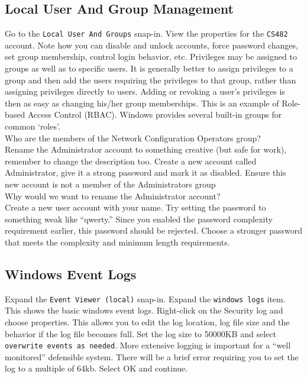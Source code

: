 \documentclass{article}
\begin{document}
\subsection{Local User And Group Management}

Go to the {\tt Local User And Groups} snap-in. View the properties for the {\tt CS482} account.  Note how you can disable and unlock accounts, force password changes, set group membership, control login behavior, etc. 
Privileges may be assigned to groups as well as to specific users. It is generally better to assign privileges to a group and then add the users requiring the privileges to that group, rather than assigning privileges directly to users. Adding or revoking a user's privileges is then as easy as changing his/her group memberships. This is an example of Role-based Access Control (RBAC). Windows provides several built-in groups for common `roles'. \\

\question Who are the members of the Network Configuration Operators group? \\

Rename the Administrator account to something creative (but safe for work), remember to change the description too. Create a new account called Administrator, give it a strong password and mark it as disabled. Ensure this new account is not a member of the Administrators group \\

\question Why would we want to rename the Administrator account? \\

Create a new user account with your name. Try setting the password to something weak like ``qwerty.'' Since you enabled the password complexity requirement earlier, this password should be rejected. Choose a stronger password that meets the complexity and minimum length requirements.
\subsection{Windows Event Logs}
Expand the {\tt Event Viewer (local)} snap-in. Expand the {\tt windows logs} item. This shows the basic windows event logs. Right-click on the Security log and choose properties. This allows you to edit the log location, log file size and the behavior if the log file becomes full. Set the log size to 50000KB and select {\tt overwrite events as needed}. More extensive logging is important for a ``well monitored'' defensible system. There will be a brief error requiring you to set the log to a multiple of 64kb. Select OK and continue.\\
\end{document}
